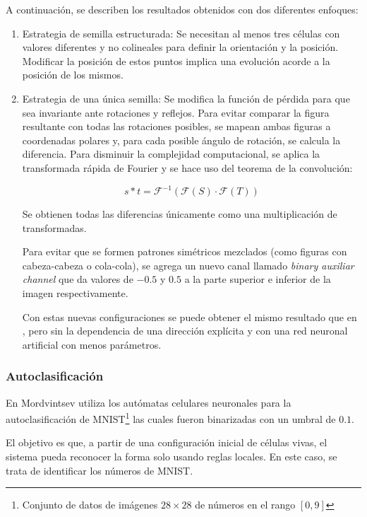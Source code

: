 A continuación, se describen los resultados obtenidos con dos diferentes enfoques:
\begin{enumerate}
	\item Estrategia de semilla estructurada: Se necesitan al menos tres células con valores diferentes y no colineales para definir la orientación y la posición. Modificar la posición de estos puntos implica una evolución acorde a la posición de los mismos.
	
	\item Estrategia de una única semilla: Se modifica la función de pérdida para que sea invariante ante rotaciones y reflejos. Para evitar comparar la figura resultante con todas las rotaciones posibles, se mapean ambas figuras a coordenadas polares y, para cada posible ángulo de rotación, se calcula la diferencia. Para disminuir la complejidad computacional, se aplica la transformada rápida de Fourier y se hace uso del teorema de la convolución:
	
	\[
	s * t = \mathcal{F}^{-1} (\mathcal{F}(S) \cdot \mathcal{F}(T)) 
	\]
	
	Se obtienen todas las diferencias únicamente como una multiplicación de transformadas.
	
	Para evitar que se formen patrones simétricos mezclados (como figuras con cabeza-cabeza o cola-cola), se agrega un nuevo canal llamado \textit{binary auxiliar channel} que da valores de $-0.5$ y $0.5$ a la parte superior e inferior de la imagen respectivamente.
	
	Con estas nuevas configuraciones se puede obtener el mismo resultado que en \cite{mordvintsevNCA}, pero sin la dependencia de una dirección explícita y con una red neuronal artificial con menos parámetros.
	
\end{enumerate}

\subsubsection{Autoclasificación}

En \cite{MNIST} Mordvintsev utiliza los autómatas celulares neuronales para la autoclasificación de MNIST\footnote{Conjunto de datos de imágenes $28 \times 28$ de números en el rango $[0,9]$} las cuales fueron binarizadas con un umbral de $0.1$. 

El objetivo es que, a partir de una configuración inicial de células vivas, el sistema pueda reconocer la forma solo usando reglas locales. En este caso, se trata de identificar los números de MNIST.

